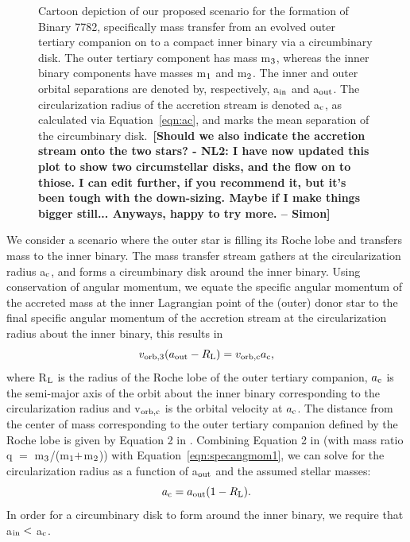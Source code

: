 \documentclass{aastex62}
\def\simon#1{{\bf {\color{red}[#1 -- Simon]}}}
\begin{document}
\begin{figure}[ht!]
\caption{Cartoon depiction of our proposed scenario for the formation
  of Binary 7782, specifically mass transfer from an evolved outer
  tertiary companion on to a compact inner binary via a circumbinary
  disk.  The outer tertiary component has mass m$_{\rm 3}$, whereas
  the inner binary components have masses m$_{\rm 1}$ and m$_{\rm 2}$.
  The inner and outer orbital separations are denoted by,
  respectively, a$_{\rm in}$ and a$_{\rm out}$.  The circularization
  radius of the accretion stream is denoted a$_{\rm c}$, as calculated
  via Equation~\ref{eqn:ac}, and marks the mean separation of the
  circumbinary disk.\
  \simon{Should we also indicate the accretion stream onto the two stars? - NL2:  I have now updated this plot to show two circumstellar disks, and the flow on to thiose.  I can edit further, if you recommend it, but it's been tough with the down-sizing.  Maybe if I make things bigger still...  Anyways, happy to try more.}
\label{fig:fig1}}
\end{figure}

We consider a scenario where the outer star is filling its Roche lobe
and transfers mass to the inner binary.  The mass transfer stream
gathers at the circularization radius a$_{\rm c}$, and forms a circumbinary disk
around the inner binary.  Using conservation of angular momentum, we
equate the specific angular momentum of the accreted mass at the inner
Lagrangian point of the (outer) donor star to the final specific
angular momentum of the accretion stream at the circularization radius
about the inner binary, this results in
\begin{equation}
\label{eqn:specangmom1}
v_{\rm orb,3}(a_{\rm out} - R_{\rm L}) = v_{\rm orb,c}a_{\rm c},
\end{equation}
where R$_{\rm L}$ is the radius of the Roche lobe of the outer
tertiary companion, $a_{\rm c}$ is the semi-major axis of the orbit
about the inner binary corresponding to the circularization radius and
v$_{\rm orb,c}$ is the orbital velocity at $a_{\rm c}$.  The distance
from the center of mass corresponding to the outer tertiary companion
defined by the Roche lobe is given by Equation 2 in
\citep{1983ApJ...268..368E}.  Combining Equation 2 in \citet{1983ApJ...268..368E} (with
mass ratio q $=$ m$_{\rm 3}$/(m$_{\rm 1} +$m$_{\rm 2}$)) with
Equation~\ref{eqn:specangmom1}, we can solve for the circularization
radius as a function of a$_{\rm out}$ and the assumed stellar masses:
\begin{equation}
\label{eqn:ac}
a_{\rm c} = a_{\rm out}(1 - R_{\rm L}).
\end{equation}
In order for a circumbinary disk to form around the inner binary, we
require that a$_{\rm in} <$ a$_{\rm c}$.
\end{document}

